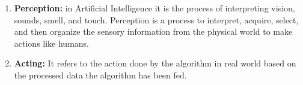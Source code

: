 \documentclass{article}
\begin{document}
\begin{enumerate}
	\item \textbf{Perception:} in Artificial Intelligence it is the process of interpreting vision, sounds, smell, and touch. Perception is a process to interpret, acquire, select, and then organize the sensory information from the physical world to make actions like humans.

	\item \textbf{Acting:} It refers to the action done by the algorithm in real world based on the processed data the algorithm has been fed.\end{enumerate}
\end{document}
